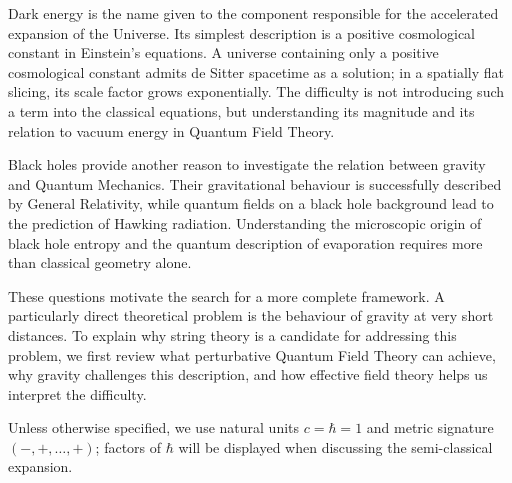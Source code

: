 Dark energy is the name given to the component responsible for the accelerated expansion of the Universe. Its simplest description is a positive cosmological constant in Einstein's equations. A universe containing only a positive cosmological constant admits de Sitter spacetime as a solution; in a spatially flat slicing, its scale factor grows exponentially. The difficulty is not introducing such a term into the classical equations, but understanding its magnitude and its relation to vacuum energy in Quantum Field Theory.

Black holes provide another reason to investigate the relation between gravity and Quantum Mechanics. Their gravitational behaviour is successfully described by General Relativity, while quantum fields on a black hole background lead to the prediction of Hawking radiation. Understanding the microscopic origin of black hole entropy and the quantum description of evaporation requires more than classical geometry alone.

These questions motivate the search for a more complete framework. A particularly direct theoretical problem is the behaviour of gravity at very short distances. To explain why string theory is a candidate for addressing this problem, we first review what perturbative Quantum Field Theory can achieve, why gravity challenges this description, and how effective field theory helps us interpret the difficulty. \begin{notz}
    Unless otherwise specified, we use natural units $c = \hbar = 1$ and metric signature $(-,+,\ldots,+)$; factors of $\hbar$ will be displayed when discussing the semi-classical expansion.
\end{notz}

